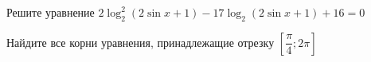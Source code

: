 \begin{ex}
	\begin{condition}
		\begin{enumcols}[label=\asbuk*)]
			\item Решите уравнение \( 2\log_2^2 (2\sin x + 1) - 17\log_2 (2\sin x + 1) + 16 = 0 \)
			\item Найдите все корни уравнения, принадлежащие отрезку \( \left[\dfrac{\pi}{4};2\pi\right] \)
		\end{enumcols}
	\end{condition}
\end{ex}